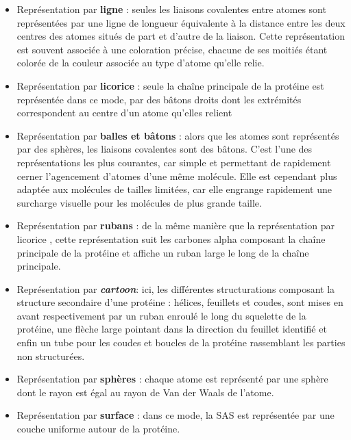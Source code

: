 \begin{itemize}
  \item Représentation par \textbf{ligne} : seules les liaisons covalentes entre atomes sont représentées par une ligne de longueur équivalente à la distance entre les deux centres des atomes situés de part et d'autre de la liaison. Cette représentation est souvent associée à une coloration précise, chacune de ses moitiés étant colorée de la couleur associée au type d'atome qu'elle relie.
  \item Représentation par \textbf{licorice} : seule la chaîne principale de la protéine est représentée dans ce mode, par des bâtons droits dont les extrémités correspondent au centre d'un atome qu'elles relient
  \item Représentation par \textbf{balles et bâtons} : alors que les atomes sont représentés par des sphères, les liaisons covalentes sont des bâtons. C'est l'une des représentations les plus courantes, car simple et permettant de rapidement cerner l'agencement d'atomes d'une même molécule. Elle est cependant plus adaptée aux molécules de tailles limitées, car elle engrange rapidement une surcharge visuelle pour les molécules de plus grande taille.
  \item Représentation par \textbf{rubans} : de la même manière que la représentation par licorice , cette représentation suit les carbones alpha composant la chaîne principale de la protéine et affiche un ruban large le long de la chaîne principale.
  \item Représentation par \textit{\textbf{cartoon}}: ici, les différentes structurations composant la structure secondaire d'une protéine : hélices, feuillets et coudes, sont mises en avant respectivement par un ruban enroulé le long du squelette de la protéine, une flèche large pointant dans la direction du feuillet identifié et enfin un tube pour les coudes et boucles de la protéine rassemblant les parties non structurées.
  \item Représentation par \textbf{sphères} : chaque atome est représenté par une sphère dont le rayon est égal au rayon de Van der Waals de l'atome.
  \item Représentation par \textbf{surface} : dans ce mode, la SAS est représentée par une couche uniforme autour de la protéine.
\end{itemize}

